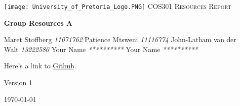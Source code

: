 \begin{titlepage}
\begin{center}
\texttt{[image: University\_of\_Pretoria\_Logo.PNG]}\newline
\textsc{\LARGE COS301 Resources Report}\newline


\textbf{Group Resources A} \\
\begin{flushright} \large
Maret Stoffberg \emph{11071762} \newline
Patience Mtsweni \emph{11116774} \newline
John-Latham van der Walt \emph{13222580} \newline
Your Name \emph{**********} \newline
Your Name \emph{**********} \newline \newline \newline
\end{flushright}
Here's a link to \href{https://github.com/MaretStoffberg/COS301_phase3_ResourcesA}{Github}.


\vfill

{\large Version 1}

{\large \today}

\end{center}
\end{titlepage}
